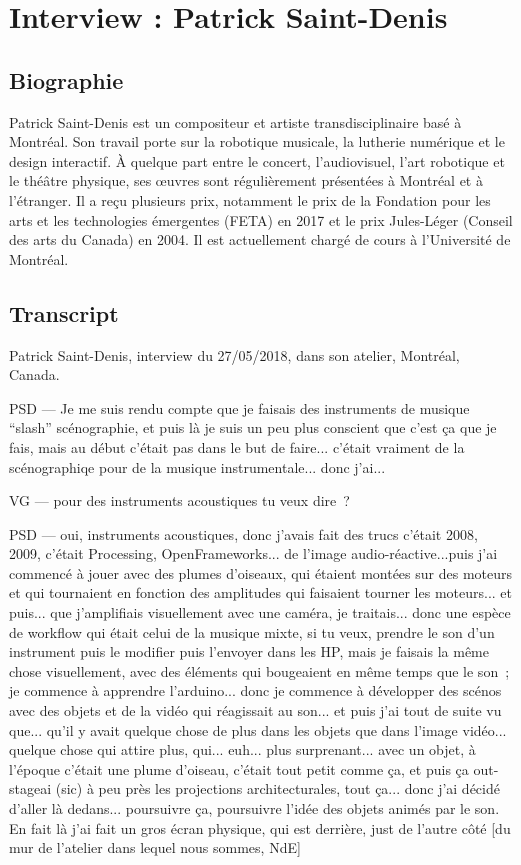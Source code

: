 \chapter{Interview : Patrick Saint-Denis}
\label{appendix:saint-denis}

\section*{Biographie}
\noindent Patrick Saint-Denis est un compositeur et artiste transdisciplinaire basé à Montréal. Son travail porte sur la robotique musicale, la lutherie numérique et le design interactif. À quelque part entre le concert, l’audiovisuel, l’art robotique et le théâtre physique, ses œuvres sont régulièrement présentées à Montréal et à l’étranger. Il a reçu plusieurs prix, notamment le prix de la Fondation pour les arts et les technologies émergentes (FETA) en 2017 et le prix Jules-Léger (Conseil des arts du Canada) en 2004. Il est actuellement chargé de cours à l’Université de Montréal.

\section*{Transcript}

\noindent Patrick Saint-Denis, interview du 27/05/2018, dans son atelier, Montréal, Canada.

PSD — Je me suis rendu compte que je faisais des instruments de musique ``slash'' scénographie, et puis là je suis un peu plus conscient que c'est ça que je fais, mais au début c'était pas dans le but de faire... c'était vraiment de la scénographiqe pour de la musique instrumentale... donc j'ai...

VG — pour des instruments acoustiques tu veux dire ?

PSD — oui, instruments acoustiques, donc j'avais fait des trucs c'était 2008, 2009, c'était Processing, OpenFrameworks... de l'image audio-réactive...puis j'ai commencé à jouer avec des plumes d'oiseaux, qui étaient montées sur des moteurs et qui tournaient en fonction des amplitudes qui faisaient tourner les moteurs... et puis... que j'amplifiais visuellement avec une caméra, je traitais... donc une espèce de workflow qui était celui de la musique mixte, si tu veux, prendre le son d'un instrument puis le modifier puis l'envoyer dans les HP, mais je faisais la même chose visuellement, avec des éléments qui bougeaient en même temps que le son ; je commence à apprendre l'arduino... donc je commence à développer des scénos avec des objets et de la vidéo qui réagissait au son... et puis j'ai tout de suite vu que... qu'il y avait quelque chose de plus dans les objets que dans l'image vidéo... quelque chose qui attire plus, qui... euh... plus surprenant... avec un objet, à l'époque c'était une plume d'oiseau, c'était tout petit comme ça, et puis ça out-stageai (sic) à peu près les projections architecturales, tout ça... donc j'ai décidé d'aller là dedans... poursuivre ça, poursuivre l'idée des objets animés par le son. En fait là j'ai fait un gros écran physique, qui est derrière, just de l'autre côté [du mur de l'atelier dans lequel nous sommes, NdE] 


